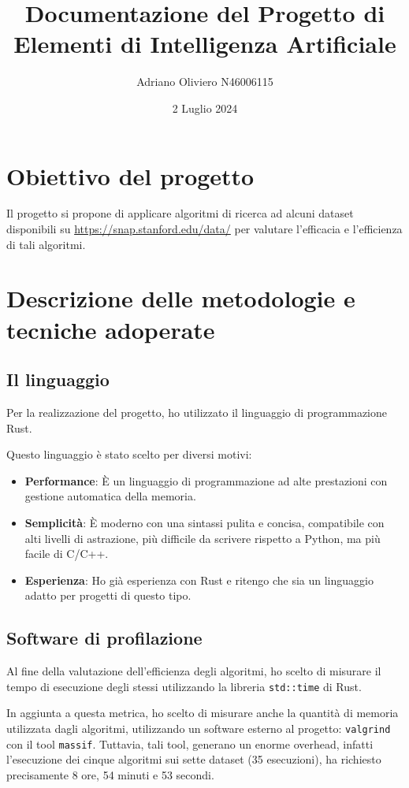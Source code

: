 \documentclass{article}
\title{Documentazione del Progetto di Elementi di Intelligenza Artificiale}
\author{Adriano Oliviero N46006115}
\date{2 Luglio 2024}
\begin{document}
\maketitle

\newpage
\tableofcontents
\newpage
\section{Obiettivo del progetto}
Il progetto si propone di applicare algoritmi di ricerca ad alcuni dataset disponibili su
\url{https://snap.stanford.edu/data/} per valutare l'efficacia e l'efficienza di tali algoritmi.

\section{Descrizione delle metodologie e tecniche adoperate}
\subsection{Il linguaggio}
Per la realizzazione del progetto, ho utilizzato il linguaggio di programmazione Rust.

Questo linguaggio è stato scelto per diversi motivi:
\begin{itemize}
	\item \textbf{Performance}: È un linguaggio di programmazione ad alte prestazioni con gestione automatica della memoria.
	\item \textbf{Semplicità}: È moderno con una sintassi pulita e concisa, compatibile con alti livelli di astrazione, più difficile da scrivere rispetto a Python, ma più facile di C/C++.
	\item \textbf{Esperienza}: Ho già esperienza con Rust e ritengo che sia un linguaggio adatto per progetti di questo tipo.
\end{itemize}

\subsection{Software di profilazione}
Al fine della valutazione dell'efficienza degli algoritmi, ho scelto di misurare il tempo di esecuzione degli stessi
utilizzando la libreria \texttt{std::time} di Rust.

In aggiunta a questa metrica, ho scelto di misurare anche la quantità
di memoria utilizzata dagli algoritmi, utilizzando un software esterno al progetto: \texttt{valgrind} con il tool \texttt{massif}.
Tuttavia, tali tool, generano un enorme overhead, infatti l'esecuzione dei cinque algoritmi sui sette dataset (35 esecuzioni),
ha richiesto precisamente 8 ore, 54 minuti e 53 secondi.
\end{document}
